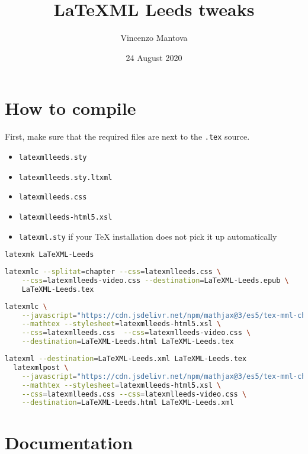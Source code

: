 \documentclass[a4paper]{article}
\title{LaTeXML Leeds tweaks}
\author{Vincenzo Mantova}
\date{24 August 2020}
\theoremstyle{definition}
\begin{document}
\maketitle

\tableofcontents

\section{How to compile}
First, make sure that the required files are next to the \verb|.tex| source.
\begin{itemize}
  \item \verb|latexmlleeds.sty|
  \item \verb|latexmlleeds.sty.ltxml|
  \item \verb|latexmlleeds.css|
  \item \verb|latexmlleeds-html5.xsl|
  \item \verb|latexml.sty| if your \TeX{} installation does not pick it up automatically
\end{itemize}

\begin{lstlisting}[language=bash,caption={Generate the PDF}]
  latexmk LaTeXML-Leeds
\end{lstlisting}
\begin{lstlisting}[language=bash,caption={Generate the EPUB}]
  latexmlc --splitat=chapter --css=latexmlleeds.css \
    --css=latexmlleeds-video.css --destination=LaTeXML-Leeds.epub \
    LaTeXML-Leeds.tex
\end{lstlisting}
\begin{lstlisting}[language=bash,caption={Generate the HTML}]
  latexmlc \
    --javascript="https://cdn.jsdelivr.net/npm/mathjax@3/es5/tex-mml-chtml.js" \
    --mathtex --stylesheet=latexmlleeds-html5.xsl \
    --css=latexmlleeds.css  --css=latexmlleeds-video.css \
    --destination=LaTeXML-Leeds.html LaTeXML-Leeds.tex
\end{lstlisting}
\begin{lstlisting}[language=bash,caption={Generate the HTML in two steps}]
  latexml --destination=LaTeXML-Leeds.xml LaTeXML-Leeds.tex
  latexmlpost \
    --javascript="https://cdn.jsdelivr.net/npm/mathjax@3/es5/tex-mml-chtml.js"\
    --mathtex --stylesheet=latexmlleeds-html5.xsl \
    --css=latexmlleeds.css --css=latexmlleeds-video.css \
    --destination=LaTeXML-Leeds.html LaTeXML-Leeds.xml
\end{lstlisting}

\section{Documentation}
\end{document}
